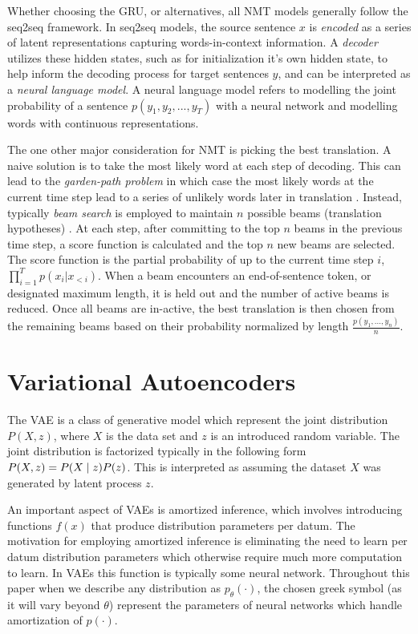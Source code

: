 Whether choosing the \ac{GRU}, or alternatives,  all \ac{NMT} models generally follow the \ac{seq2seq} framework. In \ac{seq2seq} models, the source sentence $x$ is \textit{encoded} as a series of latent representations capturing words-in-context information. A \textit{decoder} utilizes these hidden states, such as for initialization it's own hidden state, to help inform the decoding process for target sentences $y$, and can be interpreted as a \textit{neural language model}. A neural language model refers to modelling the joint probability of a sentence $p(y_{1}, y_{2}, ..., y_{T})$ with a neural network and modelling words with continuous representations.

The one other major consideration for \ac{NMT} is picking the best translation. A naive solution is to take the most likely word at each step of decoding. This can lead to the \textit{garden-path problem} in which case the most likely words at the current time step lead to a series of unlikely words later in translation \cite{koehn2017NMT}. Instead, typically \textit{beam search} is employed to maintain $n$ possible beams (translation hypotheses) \cite{koehn2017NMT}. At each step, after committing to the top $n$ beams  in the previous time step, a score function is calculated and the top $n$ new beams are selected. The score function is the partial probability of up to the current time step $i$, $\prod^{T}_{i=1} p(x_{i} | x_{<i})$. When a beam encounters an end-of-sentence token, or designated maximum length, it is held out and the number of active beams is reduced. Once all beams are in-active, the best translation is then chosen from the remaining beams based on their probability normalized by length $\frac{p(y_{1}, ..., y_{n})}{n}$. 





\section{Variational Autoencoders}

The \ac{VAE} is a class of generative model which represent the joint distribution $P(X, z)$, where $X$ is the data set and $z$ is an introduced random variable. The joint distribution is factorized typically in the following form $P(X, z) = P(X\; | \;{z})P(z)$. This is interpreted as assuming the dataset $X$ was generated by latent process  $z$. 

An important aspect of \ac{VAE}s is amortized inference, which involves introducing functions $f(x)$ that produce distribution parameters per datum. The motivation for employing amortized inference is eliminating the need to learn per datum distribution parameters which otherwise require much more computation to learn. In \ac{VAE}s this function is typically some neural network. Throughout this paper when we describe any distribution as $p_{\theta}(\cdot)$, the chosen greek symbol (as it will vary beyond $\theta$) represent the parameters of neural networks which handle amortization of $p(\cdot)$. 

